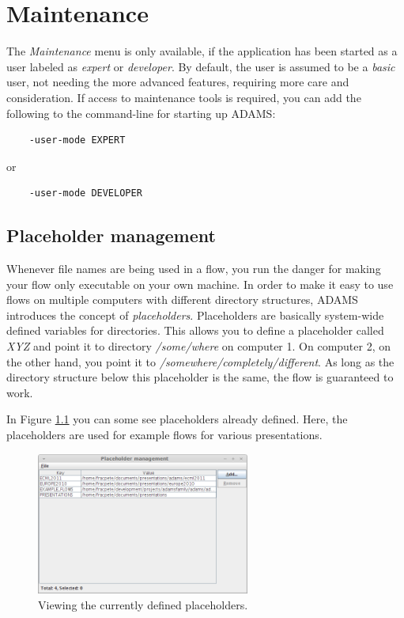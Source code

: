 
\chapter{Maintenance}
The \textit{Maintenance} menu is only available, if the application has been
started as a user labeled as \textit{expert} or \textit{developer}. By default,
the user is assumed to be a \textit{basic} user, not needing the more advanced
features, requiring more care and consideration. If access to maintenance tools
is required, you can add the following to the command-line for starting up
ADAMS:
\begin{verbatim}
	-user-mode EXPERT
\end{verbatim}
or
\begin{verbatim}
	-user-mode DEVELOPER
\end{verbatim}

\newpage
\section{Placeholder management}
Whenever file names are being used in a flow, you run the danger for making
your flow only executable on your own machine. In order to make it easy to use
flows on multiple computers with different directory structures, ADAMS 
introduces the concept of \textit{placeholders}. Placeholders are basically 
system-wide defined variables for directories. This allows you to define a
placeholder called \textit{XYZ} and point it to directory \textit{/some/where}
on computer 1. On computer 2, on the other hand, you point it to 
\textit{/somewhere/completely/different}. As long as the directory structure
below this placeholder is the same, the flow is guaranteed to work.

In Figure \ref{placeholdermanagement-main} you can some see placeholders already
defined. Here, the placeholders are used for example flows for various 
presentations.

\begin{figure}[htb]
  \centering
  \includegraphics[width=7.0cm]{images/placeholdermanagement-main.png}
  \caption{Viewing the currently defined placeholders.}
  \label{placeholdermanagement-main}
\end{figure}

